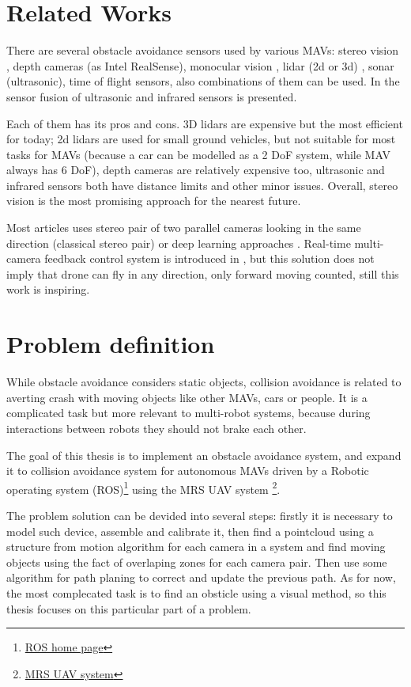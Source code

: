 \section{Related Works}
There are several obstacle avoidance sensors used by various MAVs: stereo vision \cite{Ruf2018}, depth cameras (as Intel RealSense), monocular vision \cite{Mejias2010}, lidar (2d or 3d) \cite{Ramasamy2016}, sonar (ultrasonic), time of flight sensors, also combinations of them can be used. In \cite{Rambabu2015} the sensor fusion of ultrasonic and infrared sensors is presented.

Each of them has its pros and cons. 3D lidars are expensive but the most efficient for today; 2d lidars are used for small ground vehicles, but not suitable for most tasks for MAVs (because a car can be modelled as a 2 DoF system, while MAV always has 6 DoF), depth cameras are relatively expensive too, ultrasonic and infrared sensors both have distance limits and other minor issues. Overall, stereo vision is the most promising approach for the nearest future.

Most articles uses stereo pair of two parallel cameras looking in the same direction (classical stereo pair) \cite{Yu2018, Lin2021, Xiao2019} or deep learning approaches \cite{Back2020, FragaLamas2019, Park2020, Roghair2021}. Real-time multi-camera feedback control system is introduced in \cite{He2021}, but this solution does not imply that drone can fly in any direction, only forward moving counted, still this work is inspiring.

\section{Problem definition}
While obstacle avoidance considers static objects, collision avoidance is related to averting crash with moving objects like other MAVs, cars or people. It is a complicated task but more relevant to multi-robot systems, because during interactions between robots they should not brake each other. 

The goal of this thesis is to implement an obstacle avoidance system, and expand it to collision avoidance system for autonomous MAVs driven by a Robotic operating system (ROS)\footnote{\href{https://www.ros.org/}{ROS home page}} using the MRS UAV system \cite{Baca2021} \footnote{\href{https://github.com/ctu-mrs/mrs_uav_system}{MRS UAV system}}.

The problem solution can be devided into several steps: firstly it is necessary to model such device, assemble and calibrate it, then find a pointcloud using a structure from motion algorithm for each camera in a system and find moving objects using the fact of overlaping zones for each camera pair. Then use some algorithm for path planing to correct and update the previous path. As for now, the most complecated task is to find an obsticle using a visual method, so this thesis focuses on this particular part of a problem.
